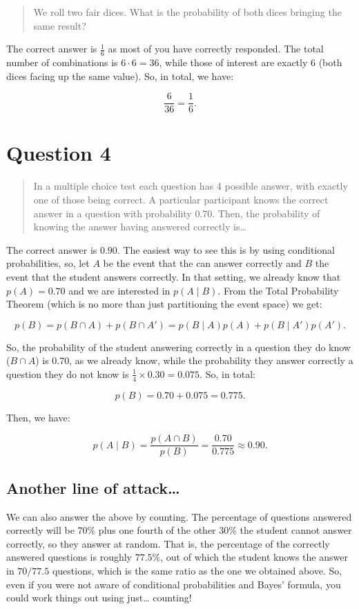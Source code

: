 \documentclass[
]{article}
\begin{document}
\begin{quote}
We roll two fair dices. What is the probability of both dices bringing
the same result?
\end{quote}

The correct answer is \(\frac{1}{6}\) as most of you have correctly
responded. The total number of combinations is \(6\cdot 6=36\), while
those of interest are exactly \(6\) (both dices facing up the same
value). So, in total, we have:

\[\frac{6}{36}=\frac{1}{6}.\]

\section{Question 4}\label{question-4}

\begin{quote}
In a multiple choice test each question has 4 possible answer, with
exactly one of those being correct. A particular participant knows the
correct answer in a question with probability 0.70. Then, the
probability of knowing the answer having answered correctly is\ldots{}
\end{quote}

The correct answer is \(0.90\). The easiest way to see this is by using
conditional probabilities, so, let \(A\) be the event that the can
answer correctly and \(B\) the event that the student answers correctly.
In that setting, we already know that \(p(A)=0.70\) and we are
interested in \(p(A\mid B)\). From the Total Probability Theorem (which
is no more than just partitioning the event space) we get:

\[p(B)=p(B\cap A)+p(B\cap A')=p(B\mid A)p(A)+p(B\mid A')p(A').\]

So, the probability of the student answering correctly in a question
they do know (\(B\cap A\)) is \(0.70\), as we already know, while the
probability they answer correctly a question they do not know is
\(\frac{1}{4}\times 0.30=0.075\). So, in total:

\[p(B)=0.70+0.075=0.775.\]

Then, we have:

\[p(A\mid B)=\frac{p(A\cap B)}{p(B)}=\frac{0.70}{0.775}\approx0.90.\]

\subsection{Another line of
attack\ldots{}}\label{another-line-of-attack}

We can also answer the above by counting. The percentage of questions
answered correctly will be \(70\%\) plus one fourth of the other
\(30\%\) the student cannot answer correctly, so they answer at random.
That is, the percentage of the correctly answered questions is roughly
\(77.5\%\), out of which the student knows the answer in \(70/77.5\)
questions, which is the same ratio as the one we obtained above. So,
even if you were not aware of conditional probabilities and Bayes'
formula, you could work things out using just\ldots{} counting!
\end{document}
